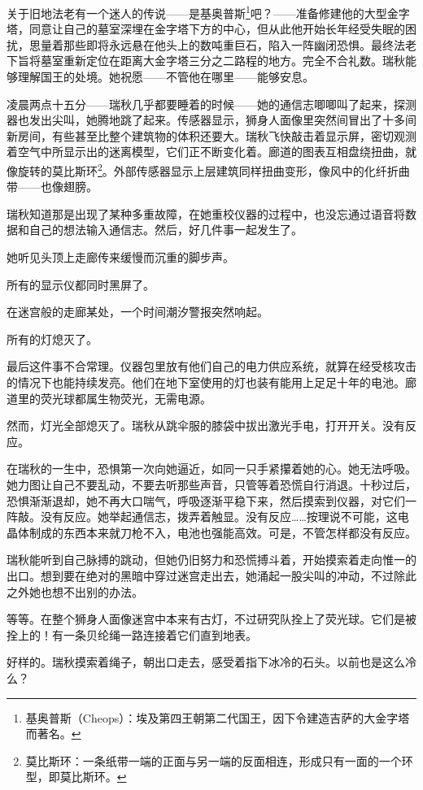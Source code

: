 \documentclass[AutoFakeBold=true]{book}
\begin{document}
关于旧地法老有一个迷人的传说——是基奥普斯\footnote{基奥普斯（Cheops）：埃及第四王朝第二代国王，因下令建造吉萨的大金字塔而著名。}吧？——准备修建他的大型金字塔，同意让自己的墓室深埋在金字塔下方的中心，但从此他开始长年经受失眠的困扰，思量着那些即将永远悬在他头上的数吨重巨石，陷入一阵幽闭恐惧。最终法老下旨将墓室重新定位在距离大金字塔三分之二路程的地方。完全不合礼数。瑞秋能够理解国王的处境。她祝愿——不管他在哪里——能够安息。

凌晨两点十五分——瑞秋几乎都要睡着的时候——她的通信志唧唧叫了起来，探测器也发出尖叫，她腾地跳了起来。传感器显示，狮身人面像里突然间冒出了十多间新房间，有些甚至比整个建筑物的体积还要大。瑞秋飞快敲击着显示屏，密切观测着空气中所显示出的迷离模型，它们正不断变化着。廊道的图表互相盘绕扭曲，就像旋转的莫比斯环\footnote{莫比斯环：一条纸带一端的正面与另一端的反面相连，形成只有一面的一个环型，即莫比斯环。}。外部传感器显示上层建筑同样扭曲变形，像风中的化纤折曲带——也像翅膀。

瑞秋知道那是出现了某种多重故障，在她重校仪器的过程中，也没忘通过语音将数据和自己的想法输入通信志。然后，好几件事一起发生了。

她听见头顶上走廊传来缓慢而沉重的脚步声。

所有的显示仪都同时黑屏了。

在迷宫般的走廊某处，一个时间潮汐警报突然响起。

所有的灯熄灭了。

最后这件事不合常理。仪器包里放有他们自己的电力供应系统，就算在经受核攻击的情况下也能持续发亮。他们在地下室使用的灯也装有能用上足足十年的电池。廊道里的荧光球都属生物荧光，无需电源。

然而，灯光全部熄灭了。瑞秋从跳伞服的膝袋中拔出激光手电，打开开关。没有反应。

在瑞秋的一生中，恐惧第一次向她逼近，如同一只手紧攥着她的心。她无法呼吸。她力图让自己不要乱动，不要去听那些声音，只管等着恐慌自行消退。十秒过后，恐惧渐渐退却，她不再大口喘气，呼吸逐渐平稳下来，然后摸索到仪器，对它们一阵敲。没有反应。她举起通信志，拨弄着触显。没有反应……按理说不可能，这电晶体制成的东西本来就刀枪不入，电池也强能高效。可是，不管怎样都没有反应。

瑞秋能听到自己脉搏的跳动，但她仍旧努力和恐慌搏斗着，开始摸索着走向惟一的出口。想到要在绝对的黑暗中穿过迷宫走出去，她涌起一股尖叫的冲动，不过除此之外她也想不出别的办法。

等等。在整个狮身人面像迷宫中本来有古灯，不过研究队拴上了荧光球。它们是被拴上的！有一条贝纶绳一路连接着它们直到地表。

好样的。瑞秋摸索着绳子，朝出口走去，感受着指下冰冷的石头。以前也是这么冷么？
\end{document}
